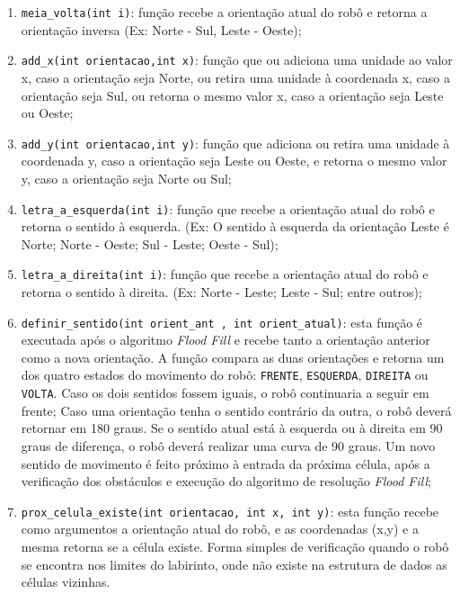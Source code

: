 \begin{enumerate}[leftmargin=2cm,label=\alph*)]
	\item \verb+meia_volta(int i)+: função recebe a orientação atual do robô e retorna a orientação inversa (Ex: Norte - Sul, Leste - Oeste);
	\item \verb+add_x(int orientacao,int x)+: função que ou adiciona uma unidade ao valor x, caso a orientação seja Norte, ou retira uma unidade à coordenada x, caso a orientação seja Sul, ou retorna o mesmo valor x, caso a orientação seja Leste ou Oeste;
	\item \verb+add_y(int orientacao,int y)+: função que adiciona ou retira uma unidade à coordenada y, caso a orientação seja Leste ou Oeste, e retorna o mesmo valor y, caso a orientação seja Norte ou Sul;
	\item \verb+letra_a_esquerda(int i)+: função que recebe a orientação atual do robô e retorna o sentido à esquerda. (Ex: O sentido à esquerda da orientação Leste é Norte; Norte - Oeste; Sul - Leste; Oeste - Sul); 
	\item \verb+letra_a_direita(int i)+: função que recebe a orientação atual do robô e retorna o sentido à direita. (Ex: Norte - Leste; Leste - Sul; entre outros);
	\item \verb+definir_sentido(int orient_ant , int orient_atual)+: esta função é executada após o algoritmo \emph{Flood Fill} e recebe tanto a orientação anterior como a nova orientação. A função compara as duas orientações e retorna um dos quatro estados do movimento do robô: \verb+FRENTE+, \verb+ESQUERDA+, \verb+DIREITA+ ou \verb+VOLTA+. Caso os dois sentidos fossem iguais, o robô continuaria a seguir em frente; Caso uma orientação tenha o sentido contrário da outra, o robô deverá retornar em 180 graus. Se o sentido atual está à esquerda ou à direita em 90 graus de diferença, o robô deverá realizar uma curva de 90 graus. Um novo sentido de movimento é feito próximo à entrada da próxima célula, após a verificação dos obstáculos e execução do algoritmo de resolução \emph{Flood Fill};
	\item \verb+prox_celula_existe(int orientacao, int x, int y)+: esta função recebe como argumentos a orientação atual do robô, e as coordenadas (x,y) e a mesma retorna se a célula existe. Forma simples de verificação quando o robô se encontra nos limites do labirinto, onde não existe na estrutura de dados as células vizinhas.
\end{enumerate}
	

